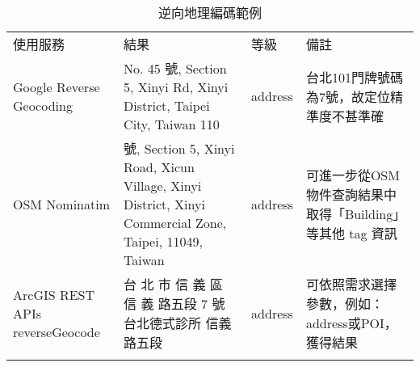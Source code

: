 \begin{table}[htbp]
\centering
\caption{逆向地理編碼範例}
\label{tab:reverseGeocodingAPI}
\begin{adjustbox}{max width=\textwidth}
\renewcommand{\arraystretch}{1.4}
\begin{tabular}{>{\centering\arraybackslash}m{3cm} >{\centering\arraybackslash}m{7.5cm} >{\centering\arraybackslash}m{2.5cm} >{\centering\arraybackslash}m{5cm}}
\Xhline{1.2pt} 
使用服務 & 結果 & 等級 & 備註 \\
\Xhline{1.2pt}
Google Reverse Geocoding & No. 45 號, Section 5, Xinyi Rd, Xinyi District, Taipei City, Taiwan 110 & address & 台北101門牌號碼為7號，故定位精準度不甚準確 \\
\hline
OSM Nominatim & 7 號, Section 5, Xinyi Road, Xicun Village, Xinyi District, Xinyi Commercial Zone, Taipei, 11049, Taiwan & address & 可進一步從OSM物件查詢結果中取得「Building」等其他 tag 資訊 \\
\hline
ArcGIS REST APIs reverseGeocode & 台 北 市 信 義 區 信 義 路五段 7 號 台北德式診所 信義路五段 & address & 可依照需求選擇參數，例如：address或POI，獲得結果 \\
\Xhline{1.2pt} 
\end{tabular}
\end{adjustbox}
\end{table}